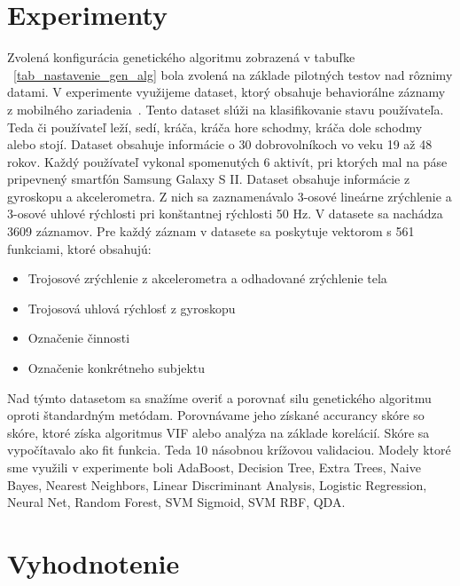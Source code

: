 \documentclass[runningheads]{llncs}
\begin{document}
\section{Experimenty}

Zvolená konfigurácia genetického algoritmu zobrazená v tabuľke ~\ref{tab_nastavenie_gen_alg} bola zvolená na 
základe pilotných testov nad rôznimy datami. V experimente využijeme dataset, ktorý obsahuje behaviorálne 
záznamy z mobilného zariadenia~\cite{ref_dataset_anguita,ref_dataset}. Tento dataset slúži na klasifikovanie
stavu používateľa. Teda či používateľ leží, sedí, kráča, kráča hore schodmy, kráča dole schodmy alebo stojí.
Dataset obsahuje informácie o 30 dobrovolníkoch vo veku 19 až 48 rokov. Každý používateľ vykonal spomenutých
6 aktivít, pri ktorých mal na páse pripevnený smartfón Samsung Galaxy S II. Dataset obsahuje informácie z 
gyroskopu a akcelerometra. Z nich sa zaznamenávalo 3-osové lineárne zrýchlenie a 3-osové uhlové rýchlosti 
pri konštantnej rýchlosti 50 Hz. V datasete sa nachádza 3609 záznamov. Pre každý záznam v datasete sa poskytuje 
vektorom s 561 funkciami, ktoré obsahujú:

\begin{itemize}
\item Trojosové zrýchlenie z akcelerometra a odhadované zrýchlenie tela
\item Trojosová uhlová rýchlosť z gyroskopu
\item Označenie činnosti
\item Označenie konkrétneho subjektu
\end{itemize}

Nad týmto datasetom sa snažíme overiť a porovnať silu genetického algoritmu oproti štandardným metódam. Porovnávame 
jeho získané accurancy skóre so skóre, ktoré získa algoritmus VIF alebo analýza na základe korelácií. Skóre sa 
vypočítavalo ako fit funkcia. Teda 10 násobnou krížovou validaciou. Modely ktoré sme využili v experimente boli 
AdaBoost, Decision Tree, Extra Trees, Naive Bayes, Nearest Neighbors, Linear Discriminant Analysis, 
Logistic Regression, Neural Net, Random Forest, SVM Sigmoid, SVM RBF, QDA.

\section{Vyhodnotenie}
\end{document}
